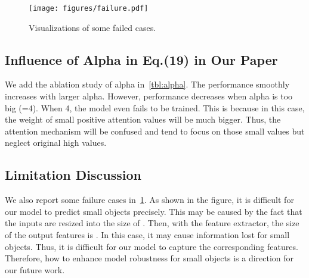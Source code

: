 \documentclass[10pt,twocolumn,letterpaper]{article}
\begin{document}
\begin{table}
	\centering
	\caption{Influence of alpha in Eq.(19) in our paper.}
\label{tbl:alpha}
\end{table}


\begin{figure}
\centering
	\texttt{[image: figures/failure.pdf]}
	\caption{Visualizations of some failed cases.}
	\label{FIG:failure}
\end{figure}

\subsection{Influence of Alpha in Eq.(19) in Our Paper} We add the ablation study of alpha in~\cref{tbl:alpha}. The performance smoothly increases with larger alpha. However, performance decreases when alpha is too big (=4). When 4, the model even fails to be trained. This is because in this case, the weight of small positive attention values will be much bigger. Thus, the attention mechanism will be confused and tend to focus on those small values but neglect original high values.

\subsection{Limitation Discussion}
We also report some failure cases in~\cref{FIG:failure}. 
As shown in the figure, it is difficult for our model to predict small objects precisely. This may be caused by the fact that the inputs are resized into the size of . Then, with the feature extractor, the size of the output features is . In this case, it may cause information lost for small objects. Thus, it is difficult for our model to capture the corresponding features. Therefore, how to enhance model robustness for small objects is a direction for our future work.
\end{document}
